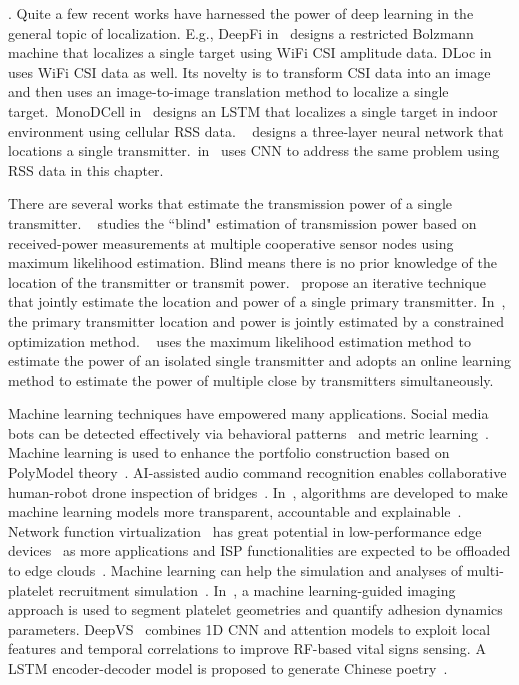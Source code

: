 . 
Quite a few recent works have harnessed the power of deep learning in the general topic of localization.
E.g., DeepFi in~\cite{DeepFi2016} designs a restricted Bolzmann machine that localizes a single target using WiFi CSI amplitude data. 
DLoc in~\cite{mobicom20-deeploc} uses WiFi CSI data as well. 
Its novelty is to transform CSI data into an image and then uses an image-to-image translation method to localize a single target.~MonoDCell 
in~\cite{sigspatial19-monodcell} designs an LSTM that localizes a single target in indoor environment using cellular RSS data.
~\cite{pimrc2021-localize} designs a three-layer neural network that locations a single transmitter.~\deeptx in~\cite{icccn20-deeptxfinder} 
uses CNN to address the same \mtl problem using RSS data in this chapter.

 There are several works that estimate the transmission power of a single transmitter.
~\cite{PowerEstimate2010Zafer} studies the ``blind" estimation of transmission power based on received-power measurements at 
multiple cooperative sensor nodes using maximum likelihood estimation. Blind means there is no prior knowledge of the location of the 
transmitter or transmit power.~\cite{Ureten2011powerlocation} propose an iterative technique that jointly estimate the location and 
power of a single primary transmitter.
In~\cite{icoin2007-powerposition}, the primary transmitter location and power is jointly estimated by a constrained optimization method.
~\cite{ipsn20-mtl} uses the maximum likelihood estimation method to estimate the power of an isolated single transmitter and 
adopts an online learning method to estimate the power of multiple close by transmitters simultaneously.

 Machine learning techniques have empowered many applications.
Social media bots can be detected effectively via behavioral patterns~\cite{wu2023botshape} and metric learning~\cite{wu2023bottrinet}.
Machine learning is used to enhance the portfolio construction based on PolyModel theory~\cite{siqiao2023}.
AI-assisted audio command recognition enables collaborative human-robot drone inspection of bridges~\cite{yuli_thesis}.
In~\cite{ziheng_thesis,ziheng2022}, algorithms are developed to make machine learning models more transparent, accountable and explainable~\cite{ziheng_relax,ziheng2023dark}.
Network function virtualization~\cite{wang2023thesis,wang2022quadrant,wang2020slos} has great potential in low-performance edge devices~\cite{wang2023scheduling}
as more applications and ISP functionalities are expected to be offloaded to edge clouds~\cite{wang2021galleon,wang2023pinolo}.
Machine learning can help the simulation and analyses of multi-platelet recruitment simulation~\cite{yicong_thesis}.
In~\cite{peineng2023}, a machine learning-guided imaging approach is used to segment platelet geometries and quantify adhesion dynamics parameters.
DeepVS~\cite{zongxing2022dl} combines 1D CNN and attention models to exploit local features and temporal correlations to improve RF-based vital signs sensing.
A LSTM encoder-decoder model is proposed to generate Chinese poetry~\cite{yubo2017text}.


